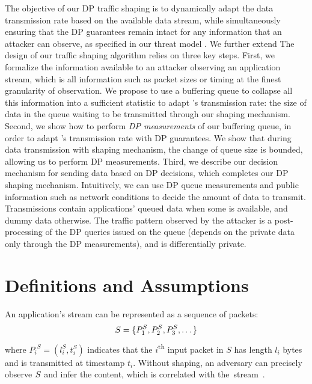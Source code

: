 The objective of our DP traffic shaping is to dynamically adapt the data transmission rate based on the available data stream, while simultaneously ensuring that the DP guarantees remain intact for any information that an attacker can observe, as specified in our threat model {\addref}.
We further extend 
The design of our traffic shaping algorithm relies on three key steps.
%
First, we formalize the information available to an attacker observing an application stream, which is all information such as packet sizes or timing at the finest granularity of observation.
We propose to use a buffering queue to collapse all this information into a sufficient statistic to adapt {\sys}'s transmission rate: the size of data in the queue waiting to be transmitted through our shaping mechanism.
%
Second, we show how to perform {\em DP measurements} of our buffering queue, in order to adapt \sys's transmission rate with DP guarantees.
We show that during data transmission with {\sys} shaping mechanism, the change of queue size is bounded, allowing us to perform DP measurements.
%
Third, we describe our decision mechanism for sending data based on DP decisions, which completes our DP shaping mechanism.
Intuitively, we can use DP queue measurements and public information such as network conditions to decide the amount of data to transmit.
Transmissions contain applications' queued data when some is available, and dummy data otherwise.
The traffic pattern observed by the attacker is a post-processing of the DP queries issued on the queue (depends on the private data only through the DP measurements), and is differentially private.


\section{Definitions and Assumptions}
\label{sec:dp-shaping-definitions}
An application's stream can be represented as a sequence of packets:
\begin{equation}
    S = \{{P^S_1}, {P^S_2}, {P^S_3}, \dots \}
\end{equation}
where ${P_i}^S = (l^S_i, t^S_i)$ indicates that the $i$\textsuperscript{th} input packet in $S$ has length $l_i$ bytes and is transmitted at timestamp $t_i$.
Without shaping, an adversary can precisely observe $S$ and infer the content, which is correlated with the~stream~\cite{schuster2017beautyburst}.

